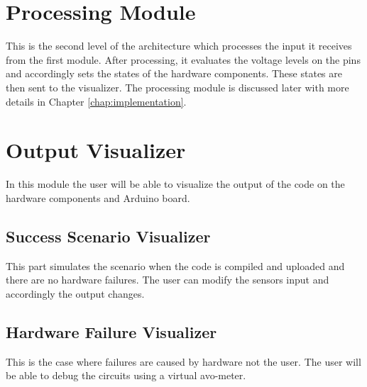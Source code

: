 \section{Processing Module}
This is the second level of the architecture which processes the input it receives from the first module. After processing, it evaluates the voltage levels on the pins and accordingly sets the states of the hardware components. These states are then sent to the visualizer. The processing module is discussed later with more details in Chapter \ref{chap:implementation}.

\section{Output Visualizer}
In this module the user will be able to visualize the output of the code on the hardware components and Arduino board.

\subsection{Success Scenario Visualizer}
This part simulates the scenario when the code is compiled and uploaded and there are no hardware failures. The user can modify the sensors input and accordingly the output changes.

\subsection{Hardware Failure Visualizer}
This is the case where failures are caused by hardware not the user. The user will be able to debug the circuits using a virtual avo-meter.


